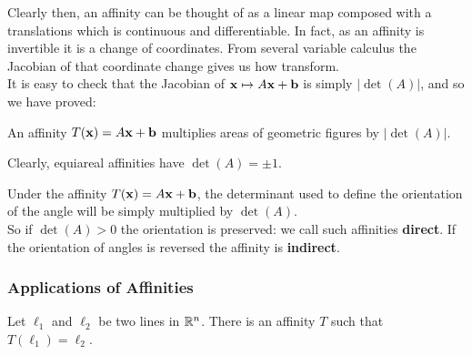 Clearly then, an affinity can be thought of as a linear map composed with a translations which is continuous and differentiable. In fact, as an affinity is invertible it is a change of coordinates. From several variable calculus the Jacobian of that coordinate change gives us how transform. \\

It is easy to check that the Jacobian of \(\mathbf{x} \mapsto A\mathbf{x} + \mathbf{b}\) is simply \(|\det(A)|\), and so we have proved:
\begin{theorem}
    An affinity \(T(\mathbf{x}) = A\mathbf{x} + \mathbf{b}\) multiplies areas of geometric figures by \(|\det(A)|\).
\end{theorem}


Clearly, equiareal affinities have \(\det(A) = \pm 1\).


Under the affinity \(T(\mathbf{x}) = A\mathbf{x} + \mathbf{b}\), the determinant used to define the orientation of the angle will be simply multiplied by \(\det(A)\). \\

So if \(\det(A) > 0\) the orientation is preserved: we call such affinities \textbf{direct}. If the orientation of angles is reversed the affinity is \textbf{indirect}.

\subsubsection{Applications of Affinities}

\begin{theorem}
    Let \(\ell_1\) and \(\ell_2\) be two lines in \(\mathbb{R}^n\). There is an affinity \(T\) such that \(T(\ell_1) = \ell_2\).
\end{theorem}

